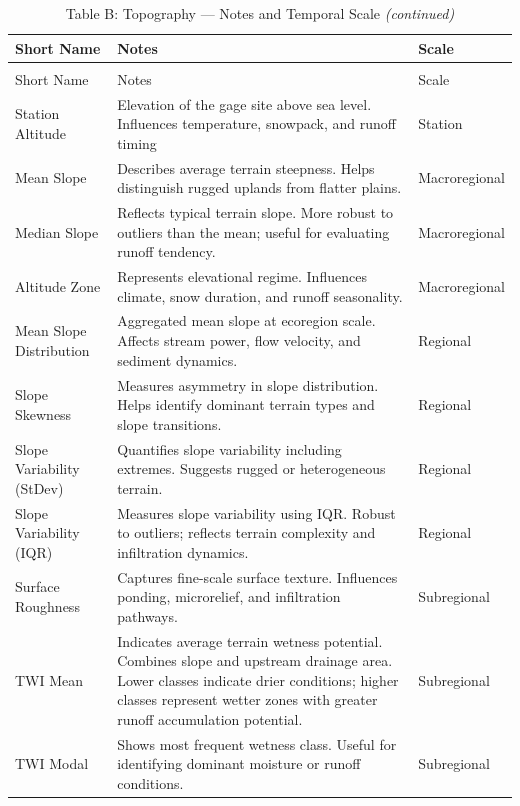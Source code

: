 \documentclass[
  10pt,
]{article}
\begin{document}
\begin{longtable}[t]{lp{8cm}l}
\caption{\label{tab:create_tables}Table B: Topography — Notes and Temporal Scale}\\
\toprule
Short Name & Notes & Scale\\
\midrule
\endfirsthead
\caption[]{Table B: Topography — Notes and Temporal Scale \textit{(continued)}}\\
\toprule
Short Name & Notes & Scale\\
\midrule
\endhead

\endfoot
\bottomrule
\endlastfoot
Station Altitude & Elevation of the gage site above sea level. Influences temperature,
snowpack, and runoff timing & Station\\
Mean Slope & Describes average terrain steepness. Helps distinguish rugged uplands
from flatter plains. & Macroregional\\
Median Slope & Reflects typical terrain slope. More robust to outliers than the mean;
useful for evaluating runoff tendency. & Macroregional\\
Altitude Zone & Represents elevational regime. Influences climate, snow duration, and
runoff seasonality. & Macroregional\\
Mean Slope Distribution & Aggregated mean slope at ecoregion scale. Affects stream power, flow
velocity, and sediment dynamics. & Regional\\
\addlinespace
Slope Skewness & Measures asymmetry in slope distribution. Helps identify dominant
terrain types and slope transitions. & Regional\\
Slope Variability (StDev) & Quantifies slope variability including extremes. Suggests rugged or
heterogeneous terrain. & Regional\\
Slope Variability (IQR) & Measures slope variability using IQR. Robust to outliers; reflects
terrain complexity and infiltration dynamics. & Regional\\
Surface Roughness & Captures fine-scale surface texture. Influences ponding, microrelief,
and infiltration pathways. & Subregional\\
TWI Mean & Indicates average terrain wetness potential. Combines slope and
upstream drainage area. Lower classes indicate drier conditions;
higher classes represent wetter zones with greater runoff accumulation
potential. & Subregional\\
\addlinespace
TWI Modal & Shows most frequent wetness class. Useful for identifying dominant
moisture or runoff conditions. & Subregional\\

\end{longtable}
\end{document}
